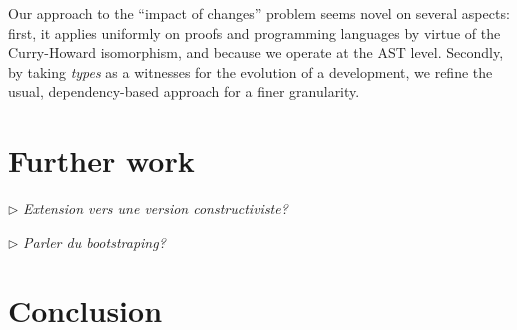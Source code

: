 \documentclass{article}
\newcommand{\remtext}[1]{\textcolor{bwgreen}{$\triangleright$ \textsl{#1}}}
\begin{document}
Our approach to the ``impact of changes'' problem seems novel on
several aspects: first, it applies uniformly on proofs and programming
languages by virtue of the Curry-Howard isomorphism, and because we
operate at the AST level. Secondly, by taking \emph{types} as a
witnesses for the evolution of a development, we refine the usual,
dependency-based approach for a finer granularity.

\section{Further work}
\label{fw}

\remtext{Extension vers une version constructiviste?}

\remtext{Parler du bootstraping?}

\section{Conclusion}








\end{document}
